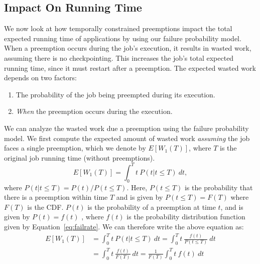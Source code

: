 
\vspace*{\subsecspace}
\subsection{Impact On Running Time}

We now look at how temporally constrained preemptions impact the total expected running time of applications by using our failure probability model. 
%
When a preemption occurs during the job's execution, it results in wasted work, assuming there is no checkpointing. 
This increases the job's total expected running time, since it must restart after a preemption.
%
The expected wasted work depends on two factors:
\begin{enumerate} [leftmargin=12pt]
\item The probability of the job being preempted during its execution. 
\item \emph{When} the preemption occurs during the execution. 
\end{enumerate}

We can analyze the wasted work due a preemption using the failure probability model.
We first compute the expected amount of wasted work \emph{assuming} the job faces a single preemption, which we denote by $E[W_1(T)]$, where $T$ is the original job running time (without preemptions).
\begin{equation}
E[W_1(T)] = \int_0^{T} t~P(t | t \leq T)~dt , 
\end{equation}
where $P(t|t\leq T) = P(t) / P(t \leq T)$. Here, $P(t\leq T)$ is the probability that there is a preemption within time $T$ and is given by $P(t \leq T) = F(T)$ where $F(T)$ is the CDF. 
$P(t)$ is the probability of a preemption at time $t$, and is given by $P(t) = f(t)$ , where $f(t)$ is the probability distribution function given by Equation~\ref{eq:failrate}.
We can therefore write the above equation as:
\begin{align}
  E[W_1(T)] &= \int_0^{T} t~P(t | t \leq T)~dt \nonumber 
  = \int_0^{T} t~\frac{f(t)}{P(t \leq T)}~dt \\ 
  &= \int_0^{T} t~\frac{f(t)}{F(T)}~dt 
    = \frac{1}{F(T)}  \int_0^{T} t~f(t)~dt
    \label{eq:wasted}
\end{align}

